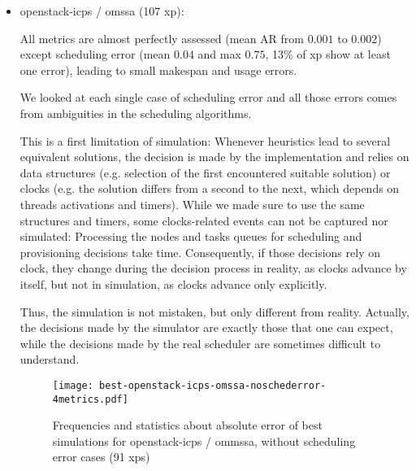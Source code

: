 \documentclass[a4paper,10pt]{article}
\newcommand\vrpath{../../lab/setup/simschlouder/validation-results/}
\begin{document}
\begin{itemize}
 \item openstack-icps / omssa (107 xp): 
 
      
 
      All metrics are almost perfectly assessed (mean AR from $0.001$ to $0.002$)
      except scheduling error 
      (mean $0.04$ and max $0.75$, 13\% of xp show at least one error), 
      leading to small makespan and usage errors. 
      
      We looked at each single case of scheduling error and all those errors 
      comes from ambiguities in the scheduling algorithms.
      
      This is a first limitation of simulation:
      Whenever heuristics lead to several equivalent solutions, 
      the decision is made by the implementation and relies on data structures 
      (e.g. selection of the first encountered suitable solution) or clocks 
      (e.g. the solution differs from a second to the next, which depends 
      on threads activations and timers). While we made sure to use the same 
      structures and timers, some clocks-related events can not be captured nor 
      simulated: Processing the nodes and tasks queues for scheduling and 
      provisioning decisions take time. Consequently, if those decisions rely on
      clock, they change during the decision process in reality, as clocks advance 
      by itself, but not in simulation, as clocks advance only explicitly.
      
      Thus, the simulation is not mistaken, but only different from reality.
      Actually, the decisions made by the simulator are exactly those that one 
      can expect, while the decisions made by the real scheduler are sometimes
      difficult to understand.

      
\begin{figure}  
  \texttt{[image: best-openstack-icps-omssa-noschederror-4metrics.pdf]}

  
      
  

\caption{Frequencies and statistics about absolute error of best simulations for openstack-icps / 
ommssa, without scheduling error cases (91 xps)}
\end{figure}       


\end{itemize}
\end{document}
